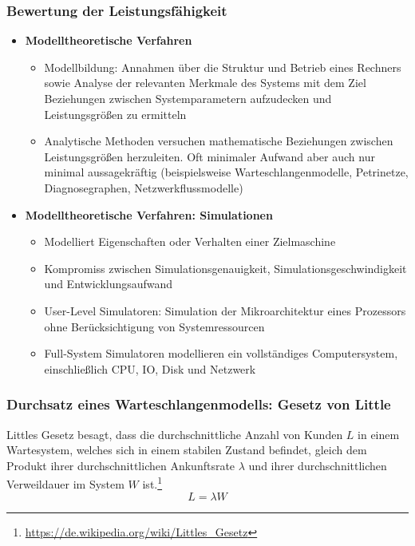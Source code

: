 \subsubsection{Bewertung der Leistungsfähigkeit}
\begin{itemize}
	\item \textbf{Modelltheoretische Verfahren}
	\begin{itemize}
		\item Modellbildung: Annahmen über die Struktur und Betrieb eines Rechners sowie Analyse der relevanten Merkmale des Systems mit dem Ziel Beziehungen zwischen Systemparametern aufzudecken und Leistungsgrößen zu ermitteln
		\item Analytische Methoden versuchen mathematische Beziehungen zwischen Leistungsgrößen herzuleiten. Oft minimaler Aufwand aber auch nur minimal aussagekräftig (beispielsweise Warteschlangenmodelle, Petrinetze, Diagnosegraphen, Netzwerkflussmodelle)
	\end{itemize}
	\item \textbf{Modelltheoretische Verfahren: Simulationen}
	\begin{itemize}
		\item Modelliert Eigenschaften oder Verhalten einer Zielmaschine
		\item Kompromiss zwischen Simulationsgenauigkeit, Simulationsgeschwindigkeit und Entwicklungsaufwand
		\item User-Level Simulatoren: Simulation der Mikroarchitektur eines Prozessors ohne Berücksichtigung von Systemressourcen
		\item Full-System Simulatoren modellieren ein vollständiges Computersystem, einschließlich CPU, IO, Disk und Netzwerk
	\end{itemize}
\end{itemize}

\subsubsection{Durchsatz eines Warteschlangenmodells: Gesetz von Little}
Littles Gesetz besagt, dass die durchschnittliche Anzahl von Kunden \(L\) in einem Wartesystem, welches sich in einem stabilen Zustand befindet, gleich dem Produkt ihrer durchschnittlichen Ankunftsrate \(\lambda\) und ihrer durchschnittlichen Verweildauer im System \(W\) ist.\footnote{\url{https://de.wikipedia.org/wiki/Littles_Gesetz}}
\[L=\lambda W\]


